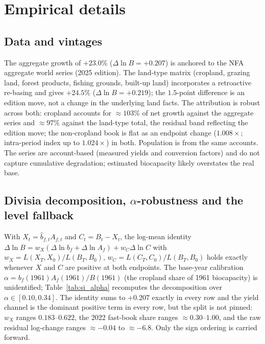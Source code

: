 \section{Empirical details}\label{si:empirical}

\subsection{Data and vintages}\label{si:vintages}

The aggregate growth of $+23.0\%$ ($\Delta\ln B=+0.207$) is anchored to the NFA aggregate world series (2025 edition). The land-type matrix (cropland, grazing land, forest products, fishing grounds, built-up land) incorporates a retroactive re-basing and gives $+24.5\%$ ($\Delta\ln B=+0.219$); the $1.5$-point difference is an edition move, not a change in the underlying land facts. The attribution is robust across both: cropland accounts for $\approx103\%$ of net growth against the aggregate series and $\approx97\%$ against the land-type total, the residual band reflecting the edition move; the non-cropland book is flat as an endpoint change ($1.008\times$; intra-period index up to $1.024\times$) in both. Population is from the same accounts. The series are account-based (measured yields and conversion factors) and do not capture cumulative degradation; estimated biocapacity likely overstates the real base.

\subsection{Divisia decomposition, $\alpha$-robustness and the level fallback}\label{si:divisia}

With $X_t=\hat b_{f,t}A_{f,t}$ and $C_t=B_t-X_t$, the log-mean identity $\Delta\ln B=w_X(\Delta\ln b_f+\Delta\ln A_f)+w_C\Delta\ln C$ with $w_X=L(X_T,X_0)/L(B_T,B_0)$, $w_C=L(C_T,C_0)/L(B_T,B_0)$ holds exactly whenever $X$ and $C$ are positive at both endpoints. The base-year calibration $\alpha=b_f(1961)A_f(1961)/B(1961)$ (the cropland share of 1961 biocapacity) is unidentified; Table~\ref{tab:si_alpha} recomputes the decomposition over $\alpha\in[0.10,0.34]$. The identity sums to $+0.207$ exactly in every row and the yield channel is the dominant positive term in every row, but the split is not pinned: $w_X$ ranges $0.183$--$0.622$, the 2022 fast-book share ranges $\approx0.30$--$1.00$, and the raw residual log-change ranges $\approx-0.04$ to $\approx-6.8$. Only the sign ordering is carried forward.

